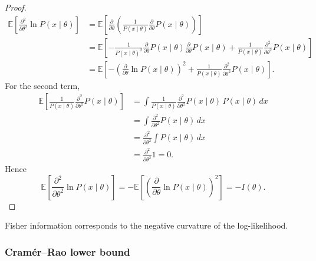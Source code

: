 \documentclass[11pt, titlepage]{article} %
\numberwithin{equation}{section}
\theoremstyle{definition}
\numberwithin{assumption}{section}
\begin{document}
\begin{proof}
\begin{align*}
    \mathbb{E}\!\left[\frac{\partial^2}{\partial \theta^2}\ln P(x\mid \theta)\right]
    &= \mathbb{E}\!\left[
    \frac{\partial}{\partial \theta}
    \left(
    \frac{1}{P(x\mid \theta)}\frac{\partial}{\partial \theta}P(x\mid \theta)
    \right)
    \right]\\
    &= \mathbb{E}\!\left[
    -\frac{1}{P(x\mid \theta)^2}
    \frac{\partial}{\partial \theta}P(x\mid \theta)
    \frac{\partial}{\partial \theta}P(x\mid \theta)
    +\frac{1}{P(x\mid \theta)}
    \frac{\partial^2}{\partial \theta^2}P(x\mid \theta)
    \right]\\
    &= \mathbb{E}\!\left[
    -\left(\frac{\partial}{\partial \theta}\ln P(x\mid \theta)\right)^2
    +\frac{1}{P(x\mid \theta)}
    \frac{\partial^2}{\partial \theta^2}P(x\mid \theta)
    \right].
\end{align*}
For the second term,
\begin{align*}
    \mathbb{E}\!\left[
    \frac{1}{P(x\mid \theta)}
    \frac{\partial^2}{\partial \theta^2}P(x\mid \theta)
    \right]
    &= \int
    \frac{1}{P(x\mid \theta)}
    \frac{\partial^2}{\partial \theta^2}P(x\mid \theta)\,
    P(x\mid \theta)\,dx\\
    &= \int \frac{\partial^2}{\partial \theta^2}P(x\mid \theta)\,dx\\
    &= \frac{\partial^2}{\partial \theta^2}\int P(x\mid \theta)\,dx\\
    &= \frac{\partial^2}{\partial \theta^2}1=0.
\end{align*}
Hence
\begin{equation*}
    \mathbb{E}\!\left[\frac{\partial^2}{\partial \theta^2}\ln P(x\mid \theta)\right]
    =-\mathbb{E}\!\left[\left(\frac{\partial}{\partial \theta}\ln P(x\mid \theta)\right)^2\right]
    =-I(\theta).
\end{equation*}
\end{proof}

Fisher information corresponds to the negative curvature of the log-likelihood.

\subsubsection*{Cram\'er--Rao lower bound}
\end{document}
